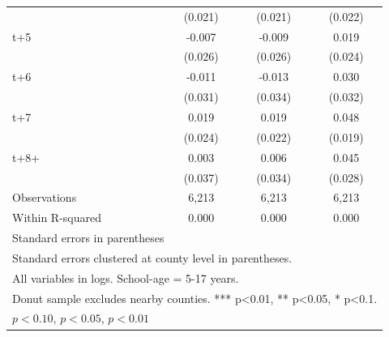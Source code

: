 \begin{table}[htbp]
\begin{tabular}{l*{3}{c}}
            &     (0.021)         &     (0.021)         &     (0.022)         \\
[1em]
t+5         &      -0.007         &      -0.009         &       0.019         \\
            &     (0.026)         &     (0.026)         &     (0.024)         \\
[1em]
t+6         &      -0.011         &      -0.013         &       0.030         \\
            &     (0.031)         &     (0.034)         &     (0.032)         \\
[1em]
t+7         &       0.019         &       0.019         &       0.048\sym{**} \\
            &     (0.024)         &     (0.022)         &     (0.019)         \\
[1em]
t+8+        &       0.003         &       0.006         &       0.045         \\
            &     (0.037)         &     (0.034)         &     (0.028)         \\
\hline
Observations&       6,213         &       6,213         &       6,213         \\
Within R-squared&       0.000         &       0.000         &       0.000         \\
\hline\hline
\multicolumn{4}{l}{\footnotesize Standard errors in parentheses}\\
\multicolumn{4}{l}{\footnotesize Standard errors clustered at county level in parentheses.}\\
\multicolumn{4}{l}{\footnotesize All variables in logs. School-age = 5-17 years.}\\
\multicolumn{4}{l}{\footnotesize Donut sample excludes nearby counties. *** p<0.01, ** p<0.05, * p<0.1.}\\
\multicolumn{4}{l}{\footnotesize \sym{*} \(p<0.10\), \sym{**} \(p<0.05\), \sym{***} \(p<0.01\)}\\
\end{tabular}
\end{table}

